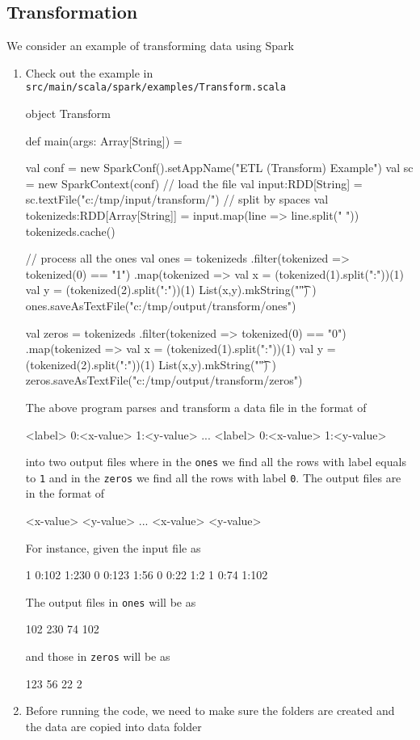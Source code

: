 \documentclass[10pt]{article}
\begin{document}
\subsection{Transformation} 
We consider an example of transforming data using Spark

\begin{enumerate}
\item Check out the example in {\tt src/main/scala/spark/examples/Transform.scala}
\begin{code}
  object Transform {
    def main(args: Array[String]) = {
      val conf = new SparkConf().setAppName("ETL (Transform) Example")
      val sc   = new SparkContext(conf)
      // load the file
      val input:RDD[String] = sc.textFile("c:/tmp/input/transform/")
      // split by spaces
      val tokenizeds:RDD[Array[String]] = input.map(line => line.split(" "))
      tokenizeds.cache()
      
      // process all the ones
      val ones = tokenizeds
      .filter(tokenized => tokenized(0) == "1")
      .map(tokenized => { 
        val x = (tokenized(1).split(":"))(1)
        val y = (tokenized(2).split(":"))(1)
        List(x,y).mkString("\t")
      })
      ones.saveAsTextFile("c:/tmp/output/transform/ones")

      val zeros = tokenizeds
      .filter(tokenized => tokenized(0) == "0")
      .map(tokenized => { 
        val x = (tokenized(1).split(":"))(1)
        val y = (tokenized(2).split(":"))(1)
        List(x,y).mkString("\t")
      })
      zeros.saveAsTextFile("c:/tmp/output/transform/zeros")
    }
  }
\end{code}
The above program parses and transform a data file in the format of 
\begin{code}
<label> 0:<x-value> 1:<y-value> 
...
<label> 0:<x-value> 1:<y-value> 
\end{code} 
into two output files where in the {\tt ones} we find all the rows with label equals to {\tt 1}  and in the {\tt zeros} we find all the rows with label {\tt 0}.
The output files are in the format of 
\begin{code}
<x-value>    <y-value>
...
<x-value>    <y-value>
\end{code}
For instance, given the input file as 
\begin{code}
1 0:102 1:230
0 0:123 1:56
0 0:22  1:2
1 0:74 1:102
\end{code}

The output files in {\tt ones} will be as 
\begin{code}
102    230
74     102
\end{code}
and those in {\tt zeros} will be as
\begin{code}
123    56
22     2
\end{code}
\item Before running the code, we need to make sure the folders are
  created and the data are copied into data folder


\end{enumerate}
\end{document}
